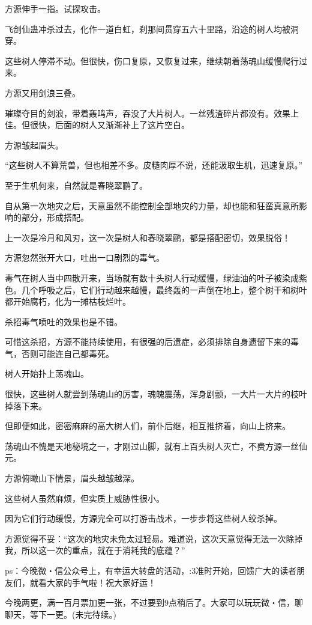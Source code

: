 \begin{this_body}
方源伸手一指。试探攻击。

飞剑仙蛊冲杀过去，化作一道白虹，刹那间贯穿五六十里路，沿途的树人均被洞穿。

这些树人停滞不动。但很快，伤口复原，又恢复过来，继续朝着荡魂山缓慢爬行过来。

方源又用剑浪三叠。

璀璨夺目的剑浪，带着轰鸣声，吞没了大片树人。一丝残渣碎片都没有。效果上佳。但很快，后面的树人又渐渐补上了这片空白。

方源皱起眉头。

“这些树人不算荒兽，但也相差不多。皮糙肉厚不说，还能汲取生机，迅速复原。”

至于生机何来，自然就是春晓翠鹂了。

自从第一次地灾之后，天意虽然不能控制全部地灾的力量，却也能和狂蛮真意所影响的部分，形成搭配。

上一次是冷月和风刃，这一次是树人和春晓翠鹂，都是搭配密切，效果脱俗！

方源忽然张开大口，吐出一口剧烈的毒气。

毒气在树人当中四散开来，当场就有数十头树人行动缓慢，绿油油的叶子被染成紫色。几个呼吸之后，它们行动越来越慢，最终轰的一声倒在地上，整个树干和树叶都开始腐朽，化为一摊枯枝烂叶。

杀招毒气喷吐的效果也是不错。

可惜这杀招，方源不能持续使用，有很强的后遗症，必须排除自身遗留下来的毒气，否则可能连自己都毒死。

树人开始扑上荡魂山。

很快，这些树人就尝到荡魂山的厉害，魂魄震荡，浑身剧颤，一大片一大片的枝叶掉落下来。

但即便如此，密密麻麻的高大树人们，前仆后继，相互推挤着，向山上挤来。

荡魂山不愧是天地秘境之一，才刚过山脚，就有上百头树人灭亡，不费方源一丝仙元。

方源俯瞰山下情景，眉头越皱越深。

这些树人虽然麻烦，但实质上威胁性很小。

因为它们行动缓慢，方源完全可以打游击战术，一步步将这些树人绞杀掉。

方源觉得不妥：“这次的地灾未免太过轻易。难道说，这次天意觉得无法一次除掉我，所以这一次的重点，就在于消耗我的底蕴？”

ps：今晚微・信公众号上，有幸运大转盘的活动，:3准时开始，回馈广大的读者朋友们，就看大家的手气啦！祝大家好运！

今晚两更，满一百月票加更一张，不过要到9点稍后了。大家可以玩玩微・信，聊聊天，等下一更。(未完待续。)

\end{this_body}

